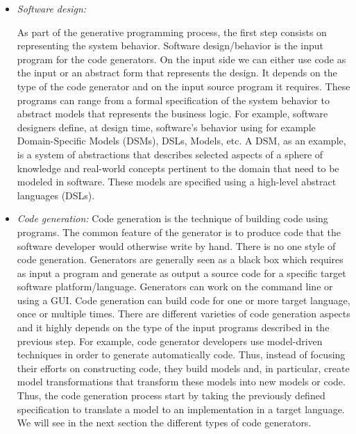 \begin{itemize}
\item \textit{Software design:} 

As part of the generative programming process, the first step consists on representing the system behavior. 
Software design/behavior is the input program for the code generators. On the input side we can either use code as the input or an abstract form that represents the design. It depends on the type of the code generator and on the input source program it requires. These programs can range from a formal specification of the system behavior to abstract models that represents the business logic.
For example, software designers define, at design time, software’s behavior using for example Domain-Specific Models (DSMs), DSLs, Models, etc.
A DSM, as an example, is a system of abstractions that describes selected aspects of a sphere of knowledge and real-world concepts pertinent to the domain that need to be modeled in software. These models are specified using a high-level abstract languages (DSLs). %

\item \textit{Code generation:} 
Code generation is the technique of building code using programs. The common feature of the generator is to produce code that the software developer would otherwise write by hand.
There is no one style of code generation. Generators are generally seen as a black box which requires as input a program and generate as output a source code for a specific target software platform/language. Generators can work on the command line or using a GUI. 
Code generation can build code for one or more target language, once or multiple times. There are different varieties of code generation aspects and it highly depends on the type of the input programs described in the previous step. 
For example, code generator developers use model-driven techniques in order to generate automatically code. Thus, instead of focusing their efforts on constructing code, they build models and, in particular, create model transformations that transform these models into new models or code. Thus, the code generation process start by taking the previously defined specification to translate a model to an implementation in a target language. We will see in the next section the different types of code generators.



\end{itemize}
